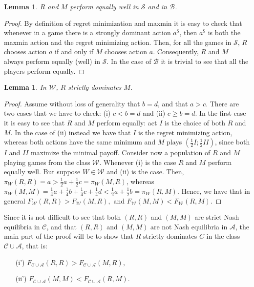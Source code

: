 \documentclass[fleqn,reqno,12pt]{article}
\theoremstyle{Satz}
\newtheorem{lemma}[theorem]{Lemma}
\theoremstyle{Bsp}
\begin{document}
\begin{lemma} \label{lemma:S-B games} $R$ and $M$ perform equally well in $\mathcal{S}$ and in
  $\mathcal{B}$.
\end{lemma}

\begin{proof}
  By definition of regret minimization and maxmin it is easy to check that whenever in a game
  there is a strongly dominant action $a^{\$}$, then $a^{\$}$ is both the maxmin action and the
  regret minimizing action. Then, for all the games in $\mathcal{S}$, $R$ chooses action $a$ if
  and only if $M$ chooses action $a$. Consequently, $R$ and $M$ always perform equally (well)
  in $\mathcal{S}$. In the case of $\mathcal{B}$ it is trivial to see that all the players
  perform equally.
\end{proof}

\begin{lemma} \label{lemma:W games} In $\mathcal{W}$, $R$ strictly dominates $M$.
\end{lemma}

\begin{proof}
  Assume without loss of generality that $b=d$, and that $ a>c $. There are two cases that we have to check:
  (i) $c < b=d$ and (ii) $c \geq b=d$. In the first case it is easy to see that $R$ and $M$
  perform equally: act $I$ is the choice of both $R$ and $M$. In the case of (ii) instead we have that $I$ is the regret minimizing action, whereas both actions have the same minimum and $M$ plays $(\frac{1}{2}I;\frac{1}{2}II)$, since both $I$ and
  $II$ maximize the minimal payoff. Consider now a population of $R$ and $M$ playing games from
  the class $\mathcal{W}$.  Whenever (i) is the case $R$ and $M$ perform equally well. But suppose $W \in \mathcal{W}$ and (ii) is the case. Then,
  $\pi_W(R,R)=a>\frac{1}{2}a+\frac{1}{2}c=\pi_W(M,R)$, whereas
  $\pi_W(M,M)=\frac{1}{4}a+\frac{1}{4}b+\frac{1}{4}c+\frac{1}{4}d<\frac{1}{2}a+\frac{1}{2}b=\pi_W(R,M)$.
  Hence, we have that in general
  $F_{\mathcal{W}}(R,R)>F_{\mathcal{W}}(M,R),\mbox{ and
  }F_{\mathcal{W}}(M,M)<F_{\mathcal{W}}(R,M)$.
\end{proof}

\noindent Since it is not difficult to see that both $(R,R)$ and $(M,M)$ are strict Nash equilibria in
$\mathcal{C}$, and that $(R,R)$ and $(M,M)$ are not Nash equilibria in $\mathcal{A}$, the main
part of the proof will be to show that $R$ strictly dominates $C$ in the class
$\mathcal{C}\cup\mathcal{A}$, that is:
\begin{multicols}{2}
  \begin{itemize}
  \item[(i')] $F_{\mathcal{C}\cup\mathcal{A}}(R,R)>F_{\mathcal{C}\cup\mathcal{A}}(M,R),$
  \item[(ii')] $F_{\mathcal{C}\cup\mathcal{A}}(M,M)<F_{\mathcal{C}\cup\mathcal{A}}(R,M).$
  \end{itemize}
\end{multicols}
\end{document}
